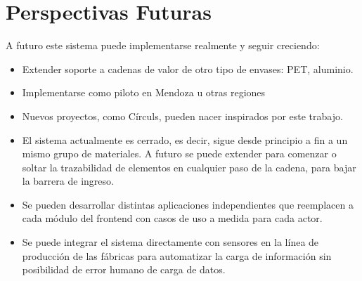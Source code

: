 \section{Perspectivas Futuras}

A futuro este sistema puede implementarse realmente y seguir creciendo:

\begin{itemize}
	\item Extender soporte a cadenas de valor de otro tipo de envases: PET, aluminio.
	\item Implementarse como piloto en Mendoza u otras regiones
	\item Nuevos proyectos, como Círculs, pueden nacer inspirados por este trabajo.
	\item El sistema actualmente es cerrado, es decir, sigue desde principio a fin a un mismo grupo de materiales. A futuro se puede extender para comenzar o soltar la trazabilidad de elementos en cualquier paso de la cadena, para bajar la barrera de ingreso.
	\item Se pueden desarrollar distintas aplicaciones independientes que reemplacen a cada módulo del frontend con casos de uso a medida para cada actor.
	\item Se puede integrar el sistema directamente con sensores en la línea de producción de las fábricas para automatizar la carga de información sin posibilidad de error humano de carga de datos.
\end{itemize}

